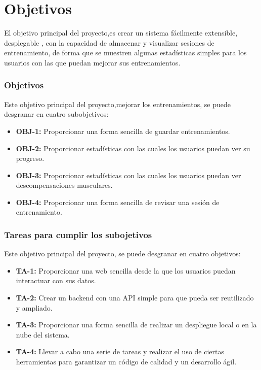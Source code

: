 \chapter{Objetivos}

El objetivo principal del proyecto,es crear un sistema fácilmente extensible, desplegable , con la capacidad de almacenar y visualizar sesiones de entrenamiento, de forma que se muestren algunas estadísticas simples para los usuarios con las que puedan mejorar sus entrenamientos. 

\subsection{Objetivos}
Este objetivo principal del proyecto,mejorar los entrenamientos, se puede desgranar en cuatro subobjetivos:

\begin{itemize}
  \item \textbf{OBJ-1:} Proporcionar una forma sencilla de guardar entrenamientos.
  \item \textbf{OBJ-2:} Proporcionar estadísticas con las cuales los usuarios puedan ver su progreso.
  \item \textbf{OBJ-3:} Proporcionar estadísticas con las cuales los usuarios puedan ver descompensaciones musculares.
  \item \textbf{OBJ-4:} Proporcionar una forma sencilla de revisar una sesión de entrenamiento.
\end{itemize}


\subsection{Tareas para cumplir los subojetivos }
Este objetivo principal del proyecto, se puede desgranar en cuatro objetivos:

\begin{itemize}
  \item \textbf{TA-1:} Proporcionar una web sencilla desde la que los usuarios puedan interactuar con sus datos.
  \item \textbf{TA-2:} Crear un \gls{backend} con una \gls{API} simple para que pueda ser reutilizado y ampliado.
  \item \textbf{TA-3:} Proporcionar una forma sencilla de realizar un despliegue local o en la nube del sistema.
  \item \textbf{TA-4:} Llevar a cabo una serie de tareas y realizar el uso de ciertas herramientas para garantizar un código de calidad y un desarrollo ágil.
\end{itemize}

